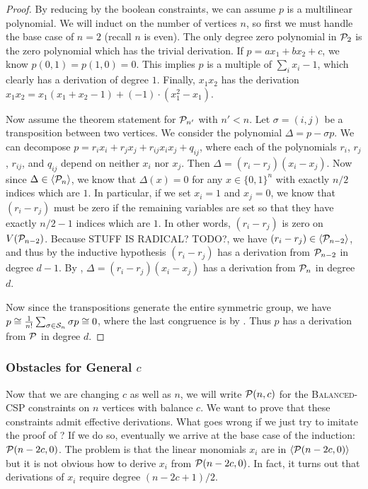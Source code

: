\begin{proof}
By reducing by the boolean constraints, we can assume $p$ is a multilinear polynomial. 
We will induct on the number of vertices $n$, so first we must handle the base case of $n = 2$ (recall $n$ is even). 
The only degree zero polynomial in $\mathcal P_2$ is the zero polynomial which has the trivial derivation. 
If $p = ax_1 + bx_2 + c$, we know $p(0,1) = p(1,0) = 0$. This implies $p$ is a multiple of $\sum_i x_i - 1$, which clearly has a derivation of degree $1$.
Finally, $x_1x_2$ has the derivation $x_1x_2 = x_1(x_1+x_2-1) + (-1)\cdot(x_1^2 - x_1)$.

Now assume the theorem statement for $\mathcal P_{n'}$ with $n' < n$. 
Let $\sigma = (i,j)$ be a transposition between two vertices. 
We consider the polynomial $\Delta = p - \sigma p$. 
We can decompose $p = r_i x_i + r_j x_j + r_{ij} x_ix_j + q_{ij}$, where each of the polynomials $r_i$, $r_j$, $r_{ij}$, and $q_{ij}$ depend on neither $x_i$ nor $x_j$. Then $\Delta = (r_i - r_j)(x_i - x_j)$. Now since $\Delta \in \langle \mathcal P_n \rangle$, we know that $\Delta(x) = 0$ for any $x \in \{0,1\}^n$ with exactly $n/2$ indices which are $1$. In particular, if we set $x_i = 1$ and $x_j = 0$, we know that $(r_i - r_j)$ must be zero if the remaining variables are set so that they have exactly $n/2 - 1$ indices which are $1$. In other words, $(r_i - r_j)$ is zero on $V(\mathcal P_{n-2})$. Because STUFF IS RADICAL? TODO?, we have $(r_i - r_j) \in \langle \mathcal P_{n-2} \rangle$, and thus by the inductive hypothesis $(r_i - r_j)$ has a derivation from $\mathcal P_{n-2}$ in degree $d-1$. By , $\Delta = (r_i - r_j)(x_i - x_j)$ has a derivation from $\mathcal P_n$ in degree $d$. 

Now since the transpositions generate the entire symmetric group, we have $p \cong \frac{1}{n!} \sum_{\sigma \in \mathcal S_n} \sigma p \cong 0$, where the last congruence is by . Thus $p$ has a derivation from $\mathcal P$ in degree $d$. 
\end{proof}

\subsubsection{Obstacles for General $c$}
Now that we are changing $c$ as well as $n$, we will write $\mathcal P(n,c)$ for the \textsc{Balanced-CSP} constraints on $n$ vertices with balance $c$.
We want to prove that these constraints admit effective derivations.
What goes wrong if we just try to imitate the proof of ?
If we do so, eventually we arrive at the base case of the induction: $\mathcal P(n-2c,0)$.
The problem is that the linear monomials $x_i$ are in $\langle \mathcal P(n-2c,0) \rangle$ but it is not obvious how to derive $x_i$ from $\mathcal P(n-2c,0)$. 
In fact, it turns out that derivations of $x_i$ require degree $(n-2c+1)/2$. 

